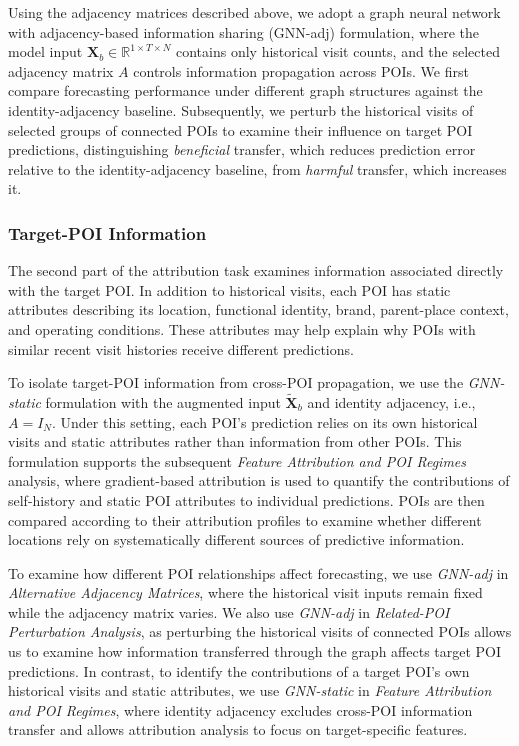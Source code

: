 \documentclass[preprint,authoryear,11pt]{elsarticle}
\theoremstyle{definition}
\begin{document}
Using the adjacency matrices described above, we adopt a graph neural network with adjacency-based information sharing (GNN-adj) formulation, where the model input \(\mathbf{X}_b\in\mathbb{R}^{1\times T\times N}\) contains only historical visit counts, and the selected adjacency matrix \(A\) controls information propagation across POIs. We first compare forecasting performance under different graph structures against the identity-adjacency baseline. Subsequently, we perturb the historical visits of selected groups of connected POIs to examine their influence on target POI predictions, distinguishing \textit{beneficial} transfer, which reduces prediction error relative to the identity-adjacency baseline, from \textit{harmful} transfer, which increases it.


\subsubsection{Target-POI Information}

The second part of the attribution task examines information associated directly with the target POI. In addition to historical visits, each POI has static attributes describing its location, functional identity, brand, parent-place context, and operating conditions. These attributes may help explain why POIs with similar recent visit histories receive different predictions.


To isolate target-POI information from cross-POI propagation, we use the \textit{GNN-static} formulation with the augmented input \(\widetilde{\mathbf{X}}_b\) and identity adjacency, i.e., \(A=I_N\).
Under this setting, each POI's prediction relies on its own historical visits and static attributes rather than information from other POIs.
This formulation supports the subsequent \textit{Feature Attribution and POI Regimes} analysis, where gradient-based attribution is used to quantify the contributions of self-history and static POI attributes to individual predictions.
POIs are then compared according to their attribution profiles to examine whether different locations rely on systematically different sources of predictive information.

To examine how different POI relationships affect forecasting, we use \textit{GNN-adj} in \textit{Alternative Adjacency Matrices}, where the historical visit inputs remain fixed while the adjacency matrix varies.
We also use \textit{GNN-adj} in \textit{Related-POI Perturbation Analysis}, as perturbing the historical visits of connected POIs allows us to examine how information transferred through the graph affects target POI predictions.
In contrast, to identify the contributions of a target POI's own historical visits and static attributes, we use \textit{GNN-static} in \textit{Feature Attribution and POI Regimes}, where identity adjacency excludes cross-POI information transfer and allows attribution analysis to focus on target-specific features.
\end{document}
